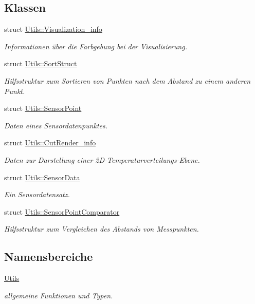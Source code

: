 \subsection*{Klassen}
\begin{DoxyCompactItemize}
\item 
struct \hyperlink{structUtils_1_1Visualization__info}{Utils\-::\-Visualization\-\_\-info}
\begin{DoxyCompactList}\small\item\em Informationen über die Farbgebung bei der Visualisierung. \end{DoxyCompactList}\item 
struct \hyperlink{structUtils_1_1SortStruct}{Utils\-::\-Sort\-Struct}
\begin{DoxyCompactList}\small\item\em Hilfsstruktur zum Sortieren von Punkten nach dem Abstand zu einem anderen Punkt. \end{DoxyCompactList}\item 
struct \hyperlink{structUtils_1_1SensorPoint}{Utils\-::\-Sensor\-Point}
\begin{DoxyCompactList}\small\item\em Daten eines Sensordatenpunktes. \end{DoxyCompactList}\item 
struct \hyperlink{structUtils_1_1CutRender__info}{Utils\-::\-Cut\-Render\-\_\-info}
\begin{DoxyCompactList}\small\item\em Daten zur Darstellung einer 2\-D-\/\-Temperaturverteilungs-\/\-Ebene. \end{DoxyCompactList}\item 
struct \hyperlink{structUtils_1_1SensorData}{Utils\-::\-Sensor\-Data}
\begin{DoxyCompactList}\small\item\em Ein Sensordatensatz. \end{DoxyCompactList}\item 
struct \hyperlink{structUtils_1_1SensorPointComparator}{Utils\-::\-Sensor\-Point\-Comparator}
\begin{DoxyCompactList}\small\item\em Hilfsstruktur zum Vergleichen des Abstands von Messpunkten. \end{DoxyCompactList}\end{DoxyCompactItemize}
\subsection*{Namensbereiche}
\begin{DoxyCompactItemize}
\item 
\hyperlink{namespaceUtils}{Utils}
\begin{DoxyCompactList}\small\item\em allgemeine Funktionen und Typen. \end{DoxyCompactList}\end{DoxyCompactItemize}
